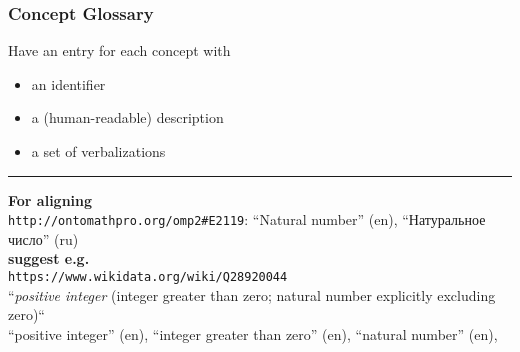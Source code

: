 \documentclass[aspectratio=169]{beamer}
\newcommand\cyr{\fontencoding{T2A}\selectfont} %
\def\texthl#1{\colorbox{yellow!50!red!70}{#1}}
\begin{document}
\begin{frame}[fragile]
    \frametitle{Concept Glossary}
    Have an entry for each concept with
    \begin{itemize}
        \item an identifier
        \item a (human-readable) description
        \item a set of verbalizations
    \end{itemize}
    \pause
    \vspace{0.5em}\par
    \noindent\rule{\textwidth}{0.8pt}
    \vspace{0.5em}\par
    \textbf{For aligning}\\
    \quad\texttt{http://ontomathpro.org/omp2\#E2119}: 
    \texthl{``Natural number''} (en), ``{\cyr Натуральное число}'' (ru)\\
    \textbf{suggest e.g.}\\
    \quad\texttt{https://www.wikidata.org/wiki/Q28920044}\\
    \quad``\textit{positive integer} (integer greater than zero; natural number explicitly excluding zero)``\\
    \quad``positive integer'' (en), ``integer greater than zero'' (en), \texthl{``natural number''} (en), \textellipsis
\end{frame}
\end{document}
